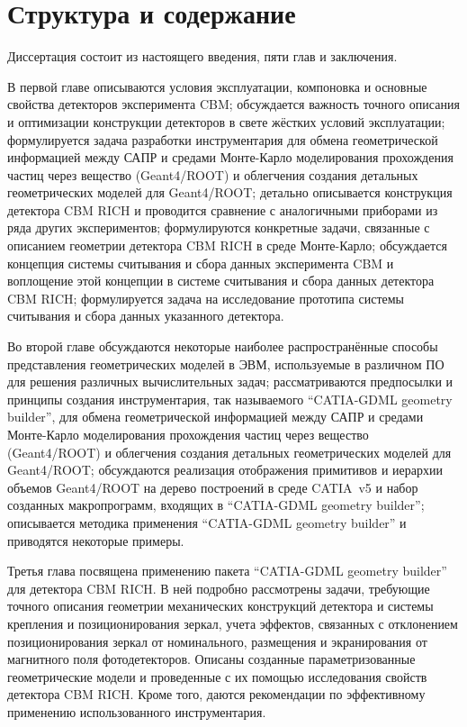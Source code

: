 \section*{Структура и содержание}\label{sec:secStructureAndContent}

Диссертация состоит из настоящего введения, пяти глав и заключения.

В первой главе
описываются условия эксплуатации, компоновка и основные свойства детекторов эксперимента CBM;
обсуждается важность точного описания и оптимизации конструкции детекторов в свете жёстких условий эксплуатации;
формулируется задача разработки инструментария для обмена геометрической информацией между САПР и средами Монте-Карло моделирования прохождения частиц через вещество (Geant4/ROOT) и облегчения создания детальных геометрических моделей для Geant4/ROOT;
детально описывается конструкция детектора CBM RICH и проводится сравнение с аналогичными приборами из ряда других экспериментов;
формулируются конкретные задачи, связанные с описанием геометрии детектора CBM RICH в среде Монте-Карло;
обсуждается концепция системы считывания и сбора данных эксперимента CBM и воплощение этой концепции в системе считывания и сбора данных детектора CBM RICH;
формулируется задача на исследование прототипа системы считывания и сбора данных указанного детектора.

Во второй главе
обсуждаются некоторые наиболее распространённые способы представления геометрических моделей в ЭВМ, используемые в различном ПО для решения различных вычислительных задач;
рассматриваются предпосылки и принципы создания инструментария, так называемого ``CATIA-GDML geometry builder'', для обмена геометрической информацией между САПР и средами Монте-Карло моделирования прохождения частиц через вещество (Geant4/ROOT) и облегчения создания детальных геометрических моделей для Geant4/ROOT;
обсуждаются реализация отображения примитивов и иерархии объемов Geant4/ROOT на дерево построений в среде CATIA~v5 и набор созданных макропрограмм, входящих в ``CATIA-GDML geometry builder'';
описывается методика применения ``CATIA-GDML geometry builder'' и приводятся некоторые примеры.

Третья глава
посвящена применению пакета ``CATIA-GDML geometry builder'' для детектора CBM RICH. В ней подробно рассмотрены задачи, требующие точного описания геометрии механических конструкций детектора и системы крепления и позиционирования зеркал, учета эффектов, связанных с отклонением позиционирования зеркал от номинального, размещения и экранирования от магнитного поля фотодетекторов. Описаны созданные параметризованные геометрические модели и проведенные с их помощью исследования свойств детектора CBM RICH. Кроме того, даются рекомендации по эффективному применению использованного инструментария.

